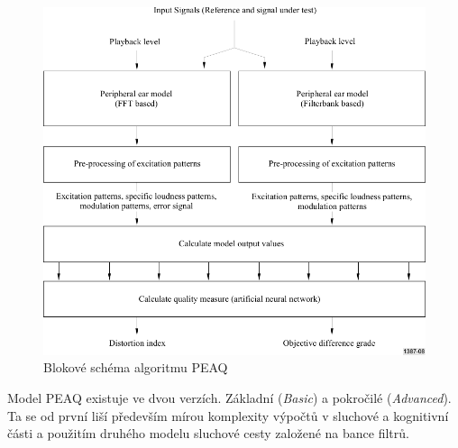 \begin{figure}[h]
    \centering
    \includegraphics[width = .75\textwidth]{pic/peaq2.pdf}
    \caption{Blokové schéma algoritmu PEAQ}
    \label{pic:peaq}
\end{figure}

Model PEAQ existuje ve dvou verzích. Základní (\textit{Basic}) a pokročilé (\textit{Advanced}). Ta se od první liší především mírou komplexity výpočtů v sluchové a kognitivní části a použitím druhého modelu sluchové cesty založené na bance filtrů.

